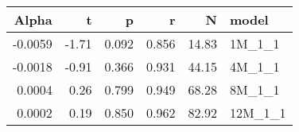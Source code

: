 \begin{table}[ht]
\centering
\begin{tabular}{rrrrrl}
  \hline
Alpha & t & p & r & N & model \\ 
  \hline
-0.0059 & -1.71 & 0.092 & 0.856 & 14.83 & 1M\_1\_1 \\ 
  -0.0018 & -0.91 & 0.366 & 0.931 & 44.15 & 4M\_1\_1 \\ 
  0.0004 & 0.26 & 0.799 & 0.949 & 68.28 & 8M\_1\_1 \\ 
  0.0002 & 0.19 & 0.850 & 0.962 & 82.92 & 12M\_1\_1 \\ 
   \hline
\end{tabular}
\end{table}

